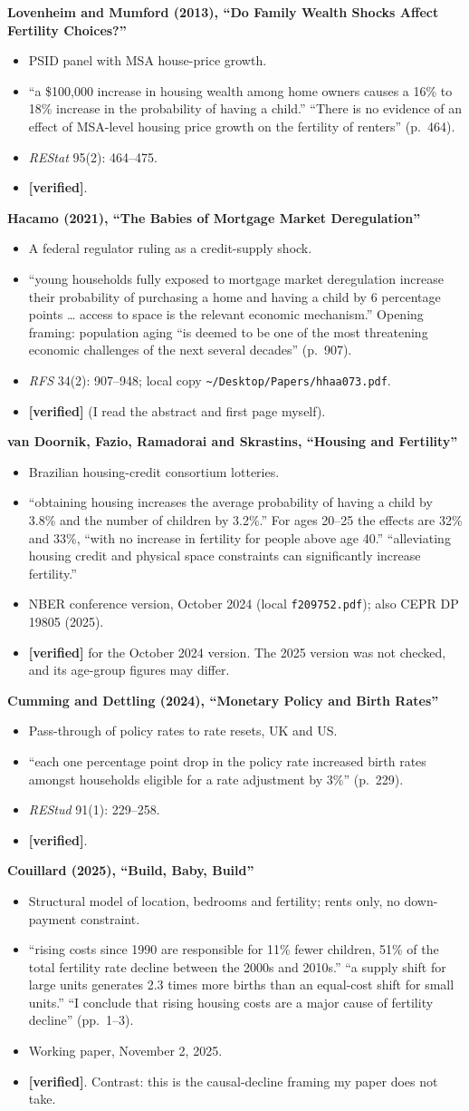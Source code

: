\documentclass[10pt]{article}
\newcommand{\ok}{\textcolor{green!45!black}{\textbf{[verified]}}}
\newcommand{\entry}[5]{%
  \textbf{#1}\par
  \begin{itemize}
    \item #2
    \item #3
    \item #4
    \item #5
  \end{itemize}}
\begin{document}
\entry{Lovenheim and Mumford (2013), ``Do Family Wealth Shocks Affect Fertility Choices?''}
{PSID panel with MSA house-price growth.}
{``a \$100,000 increase in housing wealth among home owners causes a 16\% to 18\% increase in the probability of having a child.'' ``There is no evidence of an effect of MSA-level housing price growth on the fertility of renters'' (p.~464).}
{\emph{REStat} 95(2): 464--475.}
{\ok.}

\entry{Hacamo (2021), ``The Babies of Mortgage Market Deregulation''}
{A federal regulator ruling as a credit-supply shock.}
{``young households fully exposed to mortgage market deregulation increase their probability of purchasing a home and having a child by 6 percentage points \ldots{} access to space is the relevant economic mechanism.'' Opening framing: population aging ``is deemed to be one of the most threatening economic challenges of the next several decades'' (p.~907).}
{\emph{RFS} 34(2): 907--948; local copy \texttt{\textasciitilde/Desktop/Papers/hhaa073.pdf}.}
{\ok{} (I read the abstract and first page myself).}

\entry{van Doornik, Fazio, Ramadorai and Skrastins, ``Housing and Fertility''}
{Brazilian housing-credit consortium lotteries.}
{``obtaining housing increases the average probability of having a child by 3.8\% and the number of children by 3.2\%.'' For ages 20--25 the effects are 32\% and 33\%, ``with no increase in fertility for people above age 40.'' ``alleviating housing credit and physical space constraints can significantly increase fertility.''}
{NBER conference version, October 2024 (local \texttt{f209752.pdf}); also CEPR DP 19805 (2025).}
{\ok{} for the October 2024 version. The 2025 version was not checked, and its age-group figures may differ.}

\entry{Cumming and Dettling (2024), ``Monetary Policy and Birth Rates''}
{Pass-through of policy rates to rate resets, UK and US.}
{``each one percentage point drop in the policy rate increased birth rates amongst households eligible for a rate adjustment by 3\%'' (p.~229).}
{\emph{REStud} 91(1): 229--258.}
{\ok.}

\entry{Couillard (2025), ``Build, Baby, Build''}
{Structural model of location, bedrooms and fertility; rents only, no down-payment constraint.}
{``rising costs since 1990 are responsible for 11\% fewer children, 51\% of the total fertility rate decline between the 2000s and 2010s.'' ``a supply shift for large units generates 2.3 times more births than an equal-cost shift for small units.'' ``I conclude that rising housing costs are a major cause of fertility decline'' (pp.~1--3).}
{Working paper, November 2, 2025.}
{\ok. Contrast: this is the causal-decline framing my paper does not take.}
\end{document}
